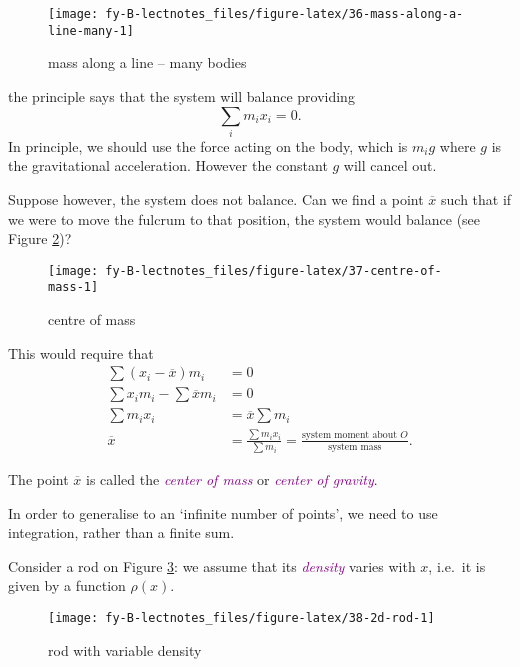 \documentclass[
  english,
  11pt,
  oneside]{book}
\newcommand{\slide}{}
\theoremstyle{definition}
\theoremstyle{definition}
\theoremstyle{definition}
\theoremstyle{definition}
\theoremstyle{remark}
\begin{document}
\begin{figure}

{\centering \texttt{[image: fy-B-lectnotes\_files/figure-latex/36-mass-along-a-line-many-1]} 

}

\caption{mass along a line -- many bodies}\label{fig:36-mass-along-a-line-many}
\end{figure}

the principle says that the system will balance providing
\[
\sum_i m_ix_i = 0.
\]
In principle, we should use the force acting on the body, which is \(m_ig\) where \(g\) is the gravitational acceleration. However the constant \(g\) will cancel out.
\slide
Suppose however, the system does not balance. Can we find a point \(\overline x\) such that if we were to move the fulcrum to that position, the system would balance (see Figure \ref{fig:37-centre-of-mass})?

\begin{figure}

{\centering \texttt{[image: fy-B-lectnotes\_files/figure-latex/37-centre-of-mass-1]} 

}

\caption{centre of mass}\label{fig:37-centre-of-mass}
\end{figure}

This would require that
\begin{align*}
\sum(x_i-\overline x)m_i& = 0\\
\sum x_i m_i-\sum{\overline x}m_i& = 0\\
\sum m_ix_i&=\overline x\sum m_i\\
\overline x&=\frac{\sum m_ix_i}{\sum m_i}=\frac{\text{system moment about $O$}}{\text{system mass}}.
\end{align*}

The point \(\overline x\) is called the \textcolor{purple}{\em center of mass} or \textcolor{purple}{\em center of gravity}.
\slide

In order to generalise to an `infinite number of points', we need to use integration, rather than a finite sum.

Consider a rod on Figure \ref{fig:38-2d-rod}: we assume that its \textcolor{purple}{\em density} varies with \(x\), i.e.~it is given by a function \(\rho(x)\).

\begin{figure}

{\centering \texttt{[image: fy-B-lectnotes\_files/figure-latex/38-2d-rod-1]} 

}

\caption{rod with variable density}\label{fig:38-2d-rod}
\end{figure}
\slide
\end{document}
